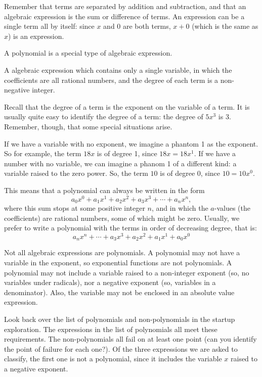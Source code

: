 Remember that terms are separated by addition and subtraction, and that an \gls{algebraic expression} is the sum or difference of terms. An expression can be a single term all by itself: since $x$ and $0$ are both terms, $x+0$ (which is the same as $x$) is an expression.

A \gls{polynomial} is a special type of algebraic expression.

\begin{boxeddef}[Polynomial]
A algebraic expression which contains only a single variable, in which the coefficients are all rational numbers, and the degree of each term is a non-negative integer.
\end{boxeddef}

Recall that the \gls{degree of a term} is the exponent on the variable of a term. It is usually quite easy to identify the degree of a term: the degree of $5x^3$ is 3. Remember, though, that some special situations arise.

If we have a variable with no exponent, we imagine a phantom 1 as the exponent. So for example, the term $18x$ is of degree 1, since $18x = 18x^1$. If we have a number with no variable, we can imagine a phanom 1 of a different kind: a variable raised to the zero power. So, the term $10$ is of degree 0, since $10 = 10x^0$.

This means that a polynomial can always be written in the form
\[a_0x^0 + a_1x^1 + a_2x^2 + a_3x^3+ \dotsb +a_nx^n,\]
where this sum stops at some positive integer $n$, and in which the $a$-values (the coefficients) are rational numbers, some of which might be zero. Usually, we prefer to write a polynomial with the terms in order of decreasing degree, that is:
\[a_nx^n + \dotsb + a_3x^3 + a_2x^2 + a_1x^1 + a_0x^0\]

Not all algebraic expressions are polynomials. A polynomial may not have a variable in the exponent, so exponential functions are not polynomials. A polynomial may not include a variable raised to a non-integer exponent (so, no variables under radicals), nor a negative exponent (so, variables in a denominator). Also, the variable may not be enclosed in an absolute value expression.

Look back over the list of polynomials and non-polynomials in the startup exploration. The expressions in the list of polynomials all meet these requirements. The non-polynomials all fail on at least one point (can you identify the point of failure for each one?). Of the three expressions we are asked to classify, the first one is not a polynomial, since it includes the variable $x$ raised to a negative exponent. 

